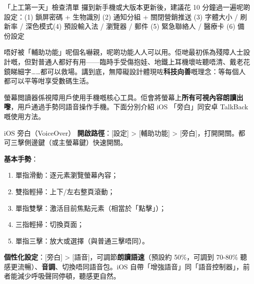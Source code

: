 \begin{tcbinfo}{「上工第一天」檢查清單}
攞到新手機或大版本更新後，建議花 10 分鐘過一遍呢啲設定：\newline (1) 鎖屏密碼 + 生物識別 (2) 通知分組 + 關閉營銷推送 (3) 字體大小 / 刷新率 / 深色模式\newline (4) 預設輸入法 / 瀏覽器 / 郵件 (5) 緊急聯絡人 / 醫療卡 (6) 備份設定

\end{tcbinfo}


唔好被「輔助功能」呢個名嚇親，呢啲功能人人可以用。佢哋最初係為殘障人士設計嘅，但對普通人都好有用——臨時手受傷抱娃、地鐵上耳機壞咗聽唔清、戴老花鏡睇細字……都可以救場。講到底，無障礙設計體現咗\textbf{科技向善}嘅理念：等每個人都可以平等咁享受數碼生活。


螢幕閲讀器係視障用戶使用手機嘅核心工具。佢會將螢幕上\textbf{所有可視內容朗讀出嚟}，用戶通過手勢同語音操作手機。下面分別介紹 iOS 「旁白」同安卓 TalkBack 嘅使用方法。

\begin{tcbinfo}{iOS 旁白（VoiceOver）}
\textbf{開啟路徑}：[設定] > [輔助功能] > [旁白]，打開開關。都可三擊側邊鍵（或主螢幕鍵）快速開關。

\textbf{基本手勢}：

\begin{enumerate}
  \item 單指滑動：逐元素瀏覽螢幕內容；
  \item 雙指輕掃：上下/左右整頁滾動；
  \item 單指雙擊：激活目前焦點元素（相當於「點擊」）；
  \item 三指輕掃：切換頁面；
  \item 單指三擊：放大或選擇（與普通三擊唔同）。
\end{enumerate}

\textbf{個性化設定}：[旁白] > [語音]，可調節\textbf{朗讀語速}（預設約 50\%，可調到 70-80\% 聽感更流暢）、\textbf{音調}、切換唔同語音包。iOS 自帶「增強語音」同「語音控制器」，前者能減少呼吸聲同停頓，聽感更自然。

\end{tcbinfo}

